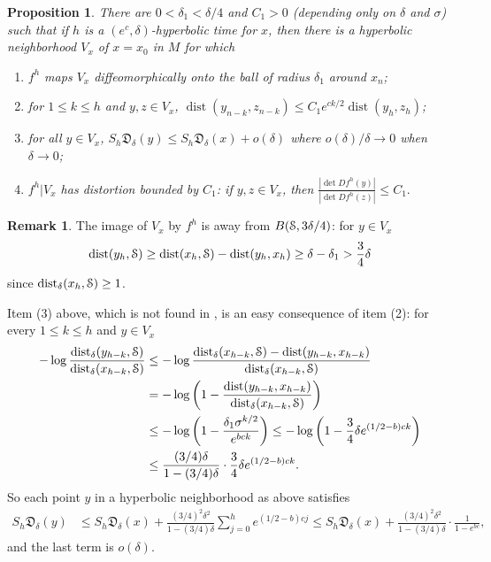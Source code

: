 \documentclass[reqno,12pt,a4paper]{amsart}
\theoremstyle{plain}
\newtheorem{proposition}[theorem]{Proposition}
\theoremstyle{definition}
\newtheorem{remark}[theorem]{Remark}
\begin{document}
 \begin{proposition}\label{p.contr}
   There are $0<\delta_1<\delta/4$ and $C_1>0$ (depending
   only on $\delta$ and $\sigma$) such that if $h$ is a
   $(e^c,\delta)$-hyperbolic time for $x$, then there is
   a \emph{hyperbolic neighborhood} $V_x$ of $x=x_0$ in $M$
   for which
   \begin{enumerate}
   \item $f^h$ maps $V_x$ diffeomorphically onto the ball of
     radius $\delta_1$ around $x_n$;
   \item for $1\le k \le h$ and $y, z\in V_x$, $
     {\operatorname{dist}}(y_{n-k},z_{n-k}) \le
     C_1 e^{ck/2}{\operatorname{dist}}(y_h,z_h)$;
   \item for all $y\in V_x$, $S_h{{\mathfrak D}}_\delta(y)\le
     S_h{{\mathfrak D}}_\delta(x) + o(\delta)$ where
     $o(\delta)/\delta\to0$ when $\delta\to0$;
   \item $f^h\vert V_x$ has distortion bounded by $C_1$: if
     $y, z\in V_x$, then
     $ \frac{|\det Df^h (y)|}{|\det Df^h (z)|}\le C_1. $
\end{enumerate}
\end{proposition}

\begin{remark}
  \label{rmk:preball-away}
  The image of $V_x$ by $f^h$ is away from
  $B({\EuScript{S}},3\delta/4)$: for $y\in V_x$
  \begin{align*}
    {\operatorname{dist}}(y_h,{\EuScript{S}})
    \ge
    {\operatorname{dist}}(x_h,{\EuScript{S}}) - {\operatorname{dist}}(y_h,x_h)
    \ge \delta-\delta_1>\frac34 \delta
  \end{align*}
  since ${\operatorname{dist}}_\delta(x_h,{\EuScript{S}})\ge1$.
\end{remark}

Item (3) above, which is not found in \cite{ABV00}, is an
easy consequence of item (2): for every $1\le k\le h$ and
$y\in V_x$
\begin{align*}
  -\log\frac{{\operatorname{dist}}_\delta(y_{h-k},{\EuScript{S}})}
  {{\operatorname{dist}}_\delta(x_{h-k},{\EuScript{S}})} &\le
  -\log\frac{{\operatorname{dist}}_\delta(x_{h-k},{\EuScript{S}})-
    {\operatorname{dist}}(y_{h-k},x_{h-k})}
  {{\operatorname{dist}}_\delta(x_{h-k},{\EuScript{S}})}
  \\
  &= -\log\left( 1-\frac{{\operatorname{dist}}(y_{h-k},x_{h-k})}
    {{\operatorname{dist}}_\delta(x_{h-k},{\EuScript{S}})} \right)
  \\
  &\le -\log\left(1-\frac{\delta_1\sigma^{k/2}}
    {e^{bck}} \right) \le
  -\log\left(1-\frac34\delta e^{(1/2-b)ck}\right)
  \\
  &\le \frac{(3/4)\delta}{1-(3/4)\delta} \cdot \frac34\delta
  e^{(1/2-b)ck}.
  \end{align*}
  So each point $y$ in a hyperbolic neighborhood as above
  satisfies
  \begin{align*}
    S_h{{\mathfrak D}}_\delta(y)
    &\le
     S_h{{\mathfrak D}}_\delta(x)
    +
    \frac{(3/4)^2\delta^2}{1-(3/4)\delta}
    \sum_{j=0}^h e^{(1/2-b)cj}
    \le
    S_h{{\mathfrak D}}_\delta(x)
    +
    \frac{(3/4)^2\delta^2}{1-(3/4)\delta}\cdot
    \frac1{1-e^{bc}},
  \end{align*}
  and the last term is $o(\delta)$.
\end{document}
